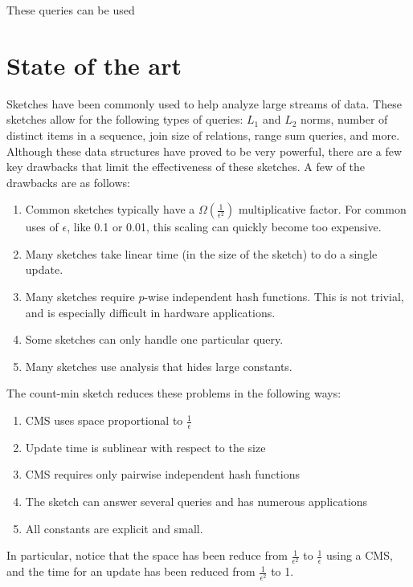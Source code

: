 \documentclass[11pt]{article}
\begin{document}
These queries can be used 

\section{State of the art}
Sketches have been commonly used to help analyze large streams of data. These sketches allow for the following types of queries: $L_1$ and $L_2$ norms, number of distinct items in a sequence, join size of relations, range sum queries, and more. Although these data structures have proved to be very powerful, there are a few key drawbacks that limit the effectiveness of these sketches. A few of the drawbacks are as follows:
\begin{enumerate}
    \item Common sketches typically have a $\Omega(\frac{1}{\epsilon^2})$ multiplicative factor. For common uses of $\epsilon$, like 0.1 or 0.01, this scaling can quickly become too expensive.
    \item Many sketches take linear time (in the size of the sketch) to do a single update. 
    \item Many sketches require $p$-wise independent hash functions. This is not trivial, and is especially difficult in hardware applications.
    \item Some sketches can only handle one particular query.
    \item Many sketches use analysis that hides large constants.
\end{enumerate}
The count-min sketch reduces these problems in the following ways:
\begin{enumerate}
    \item CMS uses space proportional to $\frac{1}{\epsilon}$
    \item Update time is sublinear with respect to the size
    \item CMS requires only pairwise independent hash functions
    \item The sketch can answer several queries and has numerous applications
    \item All constants are explicit and small.
\end{enumerate}
In particular, notice that the space has been reduce from $\frac{1}{\epsilon^2}$ to $\frac{1}{\epsilon}$ using a CMS, and the time for an update has been reduced from $\frac{1}{\epsilon^2}$ to 1.
\end{document}
